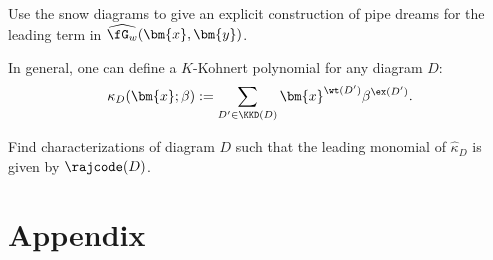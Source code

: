 \begin{prob}
Use the snow diagrams to give an explicit construction of pipe dreams for the leading term
in $\widehat{\fG_w}(\bm{x},\bm{y})$.
\end{prob}

In general, one can define a $K$-Kohnert polynomial for any diagram $D$:
\[
\kappa_D(\bm{x};\beta) := \sum_{D'\in \KKD(D)}\bm{x}^{\wt(D')} \beta^{\ex(D')}.
\]

\begin{prob}
Find characterizations of diagram $D$ such that the leading monomial of $\widehat{\kappa}_D$ is given by $\rajcode(D)$.
\end{prob}

\section{Appendix}
\label{appendix}
